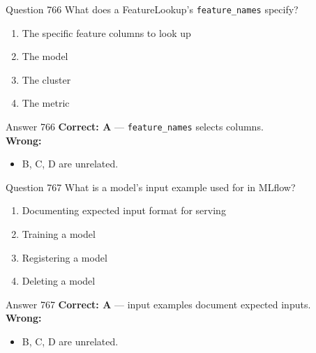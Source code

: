 \documentclass[aspectratio=169,11pt]{beamer}
\begin{document}
	\begin{frame}{Question 766}
		What does a FeatureLookup's \texttt{feature\_names} specify?
		\begin{enumerate}[label=\Alph*.]
			\item The specific feature columns to look up
			\item The model
			\item The cluster
			\item The metric
		\end{enumerate}
	\end{frame}
	\begin{frame}{Answer 766}
		\textbf{Correct: A} --- \texttt{feature\_names} selects columns.\\
		\vspace{0.5em}
		\textbf{Wrong:}
		\begin{itemize}
			\item B, C, D are unrelated.
		\end{itemize}
	\end{frame}
	
	\begin{frame}{Question 767}
		What is a model's input example used for in MLflow?
		\begin{enumerate}[label=\Alph*.]
			\item Documenting expected input format for serving
			\item Training a model
			\item Registering a model
			\item Deleting a model
		\end{enumerate}
	\end{frame}
	\begin{frame}{Answer 767}
		\textbf{Correct: A} --- input examples document expected inputs.\\
		\vspace{0.5em}
		\textbf{Wrong:}
		\begin{itemize}
			\item B, C, D are unrelated.
		\end{itemize}
	\end{frame}
	
\end{document}
